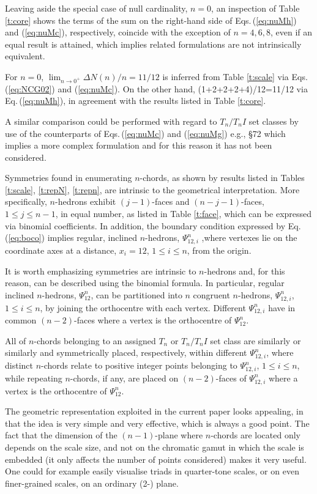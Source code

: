 \documentclass[12pt,a4paper]{article}
\begin{document}
Leaving aside the special case of null cardinality, $n=0$, an inspection of
Table \ref{t:core} shows the terms of the sum on the right-hand side of
Eqs.\,(\ref{eq:nuMh}) and (\ref{eq:nuMc}), respectively, coincide with the
exception of $n=4,6,8$, even if an equal result is attained, which implies
related formulations are not intrinsically equivalent.

For $n=0$, $\lim_{n\to0^+}\Delta N(n)/n=11/12$ is inferred from Table
\ref{t:scale} via Eqs.\,(\ref{eq:NCG02}) and (\ref{eq:nuMc}).   On the other
hand, (1+2+2+2+4)/12=11/12 via Eq.\,(\ref{eq:nuMh}), in agreement with the
results listed in Table \ref{t:core}.

A similar comparison could be performed with regard to $T_n/T_nI$ set classes
by use of the counterparts of Eqs.\,(\ref{eq:nuMc}) and (\ref{eq:nuMg}) e.g.,
\cite{Hoo07} \S72 which implies a more complex formulation and for this reason
it has not been considered.

Symmetries found in enumerating $n$-chords, as shown by results listed in
Tables
\ref{t:scale}, \ref{t:repN}, \ref{t:repn}, are intrinsic to the geometrical
interpretation.   More specifically, $n$-hedrons exhibit $(j-1)$-faces and
$(n-j-1)$-faces, $1\le j\le n-1$, in equal number, as listed in Table
\ref{t:face}, which can be expressed via binomial coefficients.   In addition,
the boundary condition expressed by Eq.\,(\ref{eq:boco}) implies regular,
inclined $n$-hedrons, $\Psi_{12,i}^n$ ,where vertexes lie on the coordinate
axes at a distance, $x_i=12$, $1\le i\le n$, from the origin.

It is worth emphasizing symmetries are intrinsic to $n$-hedrons and, for this
reason, can be described using the binomial formula.   In particular, regular
inclined $n$-hedrons, $\Psi_{12}^n$, can be partitioned into $n$ congruent
$n$-hedrons, $\Psi_{12,i}^n$, $1\le i\le n$, by joining the orthocentre with
each vertex.   Different $\Psi_{12,i}^n$ have in common $(n-2)$-faces where a
vertex is the orthocentre of $\Psi_{12}^n$.

All of $n$-chords belonging to an assigned $T_n$ or $T_n/T_nI$ set class
are similarly or similarly and symmetrically placed, respectively, within
different $\Psi_{12,i}^n$, where distinct $n$-chords relate to positive
integer points
belonging to $\Psi_{12,i}^n$, $1\le i\le n$, while repeating $n$-chords,
if any, are placed on $(n-2)$-faces of $\Psi_{12,i}^n$ where a vertex is the
orthocentre of $\Psi_{12}^n$.

The geometric representation exploited in the current paper looks
appealing, in that the idea is very simple and very effective, which is
always a good point. The fact that the dimension of the $(n-1)$-plane where
$n$-chords are located only depends on the scale size, and not on the
chromatic gamut in which the scale is embedded (it only affects the number of
points considered) makes it very useful.   One could for example easily
visualise triads in quarter-tone scales, or on even finer-grained scales,
on an ordinary (2-) plane.
\end{document}

